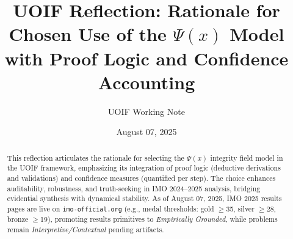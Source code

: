 \documentclass[11pt]{article}
\title{UOIF Reflection: Rationale for Chosen Use of the $\Psi(x)$ Model with Proof Logic and Confidence Accounting}
\author{UOIF Working Note}
\date{August 07, 2025}
\begin{document}
\maketitle

\begin{abstract}
This reflection articulates the rationale for selecting the $\Psi(x)$ integrity field model in the UOIF framework, emphasizing its integration of proof logic (deductive derivations and validations) and confidence measures (quantified per step). The choice enhances auditability, robustness, and truth-seeking in IMO 2024--2025 analysis, bridging evidential synthesis with dynamical stability. As of August 07, 2025, IMO 2025 results pages are live on \texttt{imo-official.org} (e.g., medal thresholds: gold $\ge$35, silver $\ge$28, bronze $\ge$19), promoting results primitives to \emph{Empirically Grounded}, while problems remain \emph{Interpretive/Contextual} pending artifacts.
\end{abstract}
\end{document}
